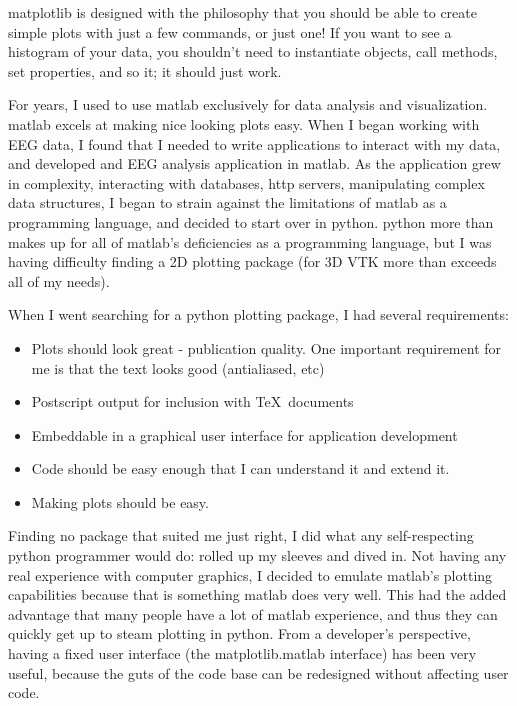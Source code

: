 \documentclass[]{book}
\begin{document}
matplotlib is designed with the philosophy that you should be able to
create simple plots with just a few commands, or just one!  If you
want to see a histogram of your data, you shouldn't need to
instantiate objects, call methods, set properties, and so it; it
should just work.  

For years, I used to use matlab exclusively for data analysis and
visualization.  matlab excels at making nice looking plots easy.  When
I began working with EEG data, I found that I needed to write
applications to interact with my data, and developed and EEG analysis
application in matlab.  As the application grew in complexity,
interacting with databases, http servers, manipulating complex data
structures, I began to strain against the limitations of matlab as a
programming language, and decided to start over in python.  python
more than makes up for all of matlab's deficiencies as a programming
language, but I was having difficulty finding a 2D plotting package
(for 3D VTK more than exceeds all of my needs).

When I went searching for a python plotting package, I had several
requirements:

\begin{itemize}
  
\item Plots should look great - publication quality.  One important
  requirement for me is that the text looks good (antialiased, etc)

\item Postscript output for inclusion with \TeX\ documents
  
\item Embeddable in a graphical user interface for application
  development
  
\item Code should be easy enough that I can understand it and extend
  it.

\item Making plots should be easy.

\end{itemize}

\noindent Finding no package that suited me just right, I did what any
self-respecting python programmer would do: rolled up my sleeves and
dived in.  Not having any real experience with computer graphics, I
decided to emulate matlab's plotting capabilities because that is
something matlab does very well.  This had the added advantage that
many people have a lot of matlab experience, and thus they can quickly
get up to steam plotting in python.  From a developer's perspective,
having a fixed user interface (the matplotlib.matlab interface) has
been very useful, because the guts of the code base can be redesigned
without affecting user code.
\end{document}
